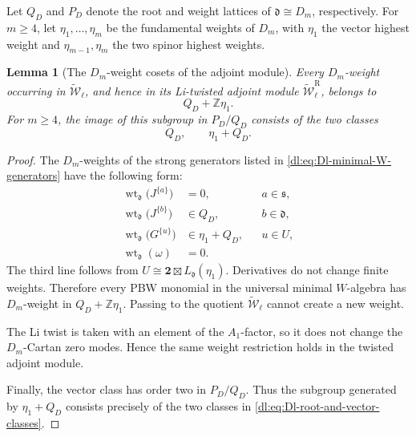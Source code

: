 \documentclass[11pt,reqno]{amsart}
\newtheorem{lemma}[theorem]{Lemma}
\theoremstyle{definition}
\theoremstyle{remark}
\begin{document}
Let \(Q_D\) and \(P_D\) denote the root and weight lattices of
\(\mathfrak d\cong D_m\), respectively.  For \(m\ge4\), let
\(\eta_1,\ldots,\eta_m\) be the fundamental weights of \(D_m\), with
\(\eta_1\) the vector highest weight and
\(\eta_{m-1},\eta_m\) the two spinor highest weights.

\begin{lemma}[The \(D_m\)-weight cosets of the adjoint module]
\label{dl:lem:Dl-adjoint-D-weight-cosets}
Every \(D_m\)-weight occurring in
\(\widetilde{\mathcal W}_\ell\), and hence in its Li-twisted adjoint
module \(\widetilde{\mathcal W}_\ell^{\mathrm R}\), belongs to
\begin{equation*}
  Q_D+\mathbb Z\eta_1.
\end{equation*}
For \(m\ge4\), the image of this subgroup in \(P_D/Q_D\) consists of
the two classes
\begin{equation}
  Q_D,
  \qquad
  \eta_1+Q_D.
  \label{dl:eq:Dl-root-and-vector-classes}
\end{equation}
\end{lemma}

\begin{proof}
The \(D_m\)-weights of the strong generators listed in
\eqref{dl:eq:Dl-minimal-W-generators} have the following form:
\begin{equation*}
\begin{aligned}
  \operatorname{wt}_{\mathfrak d}
  \bigl(J^{\{a\}}\bigr)
  &=0,
  &&a\in\mathfrak s,\\
  \operatorname{wt}_{\mathfrak d}
  \bigl(J^{\{b\}}\bigr)
  &\in Q_D,
  &&b\in\mathfrak d,\\
  \operatorname{wt}_{\mathfrak d}
  \bigl(G^{\{u\}}\bigr)
  &\in\eta_1+Q_D,
  &&u\in U,\\
  \operatorname{wt}_{\mathfrak d}(\omega)
  &=0.
\end{aligned}
\end{equation*}
The third line follows from
\(U\cong\mathbf2\boxtimes L_{\mathfrak d}(\eta_1)\).
Derivatives do not change finite weights.  Therefore every PBW
monomial in the universal minimal \(W\)-algebra has \(D_m\)-weight in
\(Q_D+\mathbb Z\eta_1\).  Passing to the quotient
\(\widetilde{\mathcal W}_\ell\) cannot create a new weight.

The Li twist is taken with an element of the \(A_1\)-factor, so it does
not change the \(D_m\)-Cartan zero modes.  Hence the same weight
restriction holds in the twisted adjoint module.

Finally, the vector class has order two in \(P_D/Q_D\).  Thus the
subgroup generated by \(\eta_1+Q_D\) consists precisely of the two
classes in \eqref{dl:eq:Dl-root-and-vector-classes}.
\end{proof}
\end{document}
